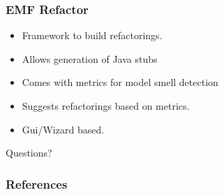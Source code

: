 \documentclass{beamer}
\begin{document}
        
\begin{frame}
\frametitle{EMF Refactor}
\begin{itemize}
 \item Framework to build refactorings.
 \item Allows generation of Java stubs
 \item Comes with metrics for model smell detection
 \item Suggests refactorings based on metrics.
 \item Gui/Wizard based.
\end{itemize}

\end{frame}
        

\begin{frame}
 \begin{center}
\Huge Questions?
\end{center}
\end{frame}

\begin{frame}
 \frametitle{References}
 
 
\end{frame}
\end{document}
